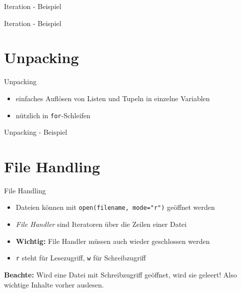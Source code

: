 \begin{frame}{Iteration - Beispiel}
	
\end{frame}

\begin{frame}{Iteration - Beispiel}
	
\end{frame}


\section{Unpacking}

\begin{frame}{Unpacking}
	\begin{itemize}
		\item einfaches Auflösen von Listen und Tupeln in einzelne Variablen
		\item nützlich in \alert{\texttt{for}}-Schleifen
	\end{itemize}
\end{frame}

\begin{frame}{Unpacking - Beispiel}
	
\end{frame}


\section{File Handling}

\begin{frame}{File Handling}
	\begin{itemize}
		\item Dateien können mit \alert{\texttt{open(filename, mode="r")}} geöffnet werden
		\item \textit{File Handler} sind Iteratoren über die Zeilen einer Datei
		\item \textbf{Wichtig:} File Handler müssen auch wieder geschlossen werden
		\item \texttt{r} steht für Lesezugriff,  \texttt{w} für Schreibzugriff
	\end{itemize}
	\textbf{Beachte:} Wird eine Datei mit Schreibzugriff geöffnet, wird sie geleert! Also wichtige Inhalte vorher auslesen.
\end{frame}

